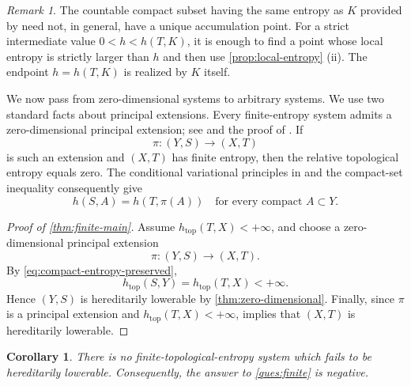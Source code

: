 \documentclass[12pt,letterpaper,reqno]{amsart}
\newcommand{\htop}{h_{\mathrm{top}}}
\newtheorem{corollary}[theorem]{Corollary}
\theoremstyle{definition}
\theoremstyle{remark}
\newtheorem{remark}[theorem]{Remark}
\numberwithin{equation}{section}
\begin{document}
	\begin{remark}
		The countable compact subset having the same entropy as $K$ provided by
		\cite[Theorem~5.1(3)]{HYZ2010}need not, in general, have a unique
		accumulation point.  For a strict intermediate value
		$0<h<h(T,K)$, it is enough to find a point whose local entropy is strictly
		larger than $h$ and then use \cref{prop:local-entropy} (ii). The endpoint
		$h=h(T,K)$ is realized by $K$ itself.
	\end{remark}
	
	We now pass from zero-dimensional systems to arbitrary systems. We use two
	standard facts about principal extensions. Every finite-entropy system admits
	a zero-dimensional principal extension; see
	\cite{BoyleDownarowicz2004,DownarowiczHuczek2013} and the proof
	of \cite[Theorem~3.8]{HYZ2014}. If
	\[
	\pi\colon(Y,S)\longrightarrow(X,T)
	\]
	is such an extension and $(X,T)$ has finite entropy, then the relative
	topological entropy equals zero. The conditional variational principles in
	\cite{LedrappierWalters1977,DownarowiczSerafin2002} and the compact-set
	inequality \cite[Proposition~7.3]{HYZ2010} consequently give
	\begin{equation}
		h(S,A)=h(T,\pi(A))
		\quad\text{for every compact }A\subset Y.
		\label{eq:compact-entropy-preserved}
	\end{equation}
	
	\begin{proof}[Proof of \cref{thm:finite-main}]
		Assume $\htop(T,X)<+\infty$, and choose a zero-dimensional principal
		extension
		\[
		\pi\colon(Y,S)\longrightarrow(X,T).
		\]
		By \eqref{eq:compact-entropy-preserved},
		\[
		\htop(S,Y)=\htop(T,X)<+\infty.
		\]
		Hence $(Y,S)$ is hereditarily lowerable by
		\cref{thm:zero-dimensional}.  Finally, since $\pi$ is a principal
		extension and $\htop(T,X)<+\infty$,
		\cite[Proposition~7.8 (2)]{HYZ2010} implies that $(X,T)$ is
		hereditarily lowerable.
	\end{proof}
	
	\begin{corollary}
		\label{cor:question}
		There is no finite-topological-entropy system which fails to be hereditarily
		lowerable. Consequently, the answer to \cref{ques:finite} is negative.
	\end{corollary}
	
	
\end{document}
